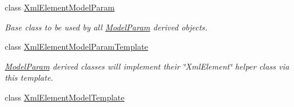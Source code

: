 \begin{DoxyCompactItemize}
class \hyperlink{class_k_k_m_l_l_1_1_xml_element_model_param}{Xml\+Element\+Model\+Param}
\begin{DoxyCompactList}\small\item\em Base class to be used by all \hyperlink{class_k_k_m_l_l_1_1_model_param}{Model\+Param} derived objects. \end{DoxyCompactList}\item 
class \hyperlink{class_k_k_m_l_l_1_1_xml_element_model_param_template}{Xml\+Element\+Model\+Param\+Template}
\begin{DoxyCompactList}\small\item\em \hyperlink{class_k_k_m_l_l_1_1_model_param}{Model\+Param} derived classes will implement their \char`\"{}\+Xml\+Element\char`\"{} helper class via this template. \end{DoxyCompactList}\item 
class \hyperlink{class_k_k_m_l_l_1_1_xml_element_model_template}{Xml\+Element\+Model\+Template}
\end{DoxyCompactItemize}
